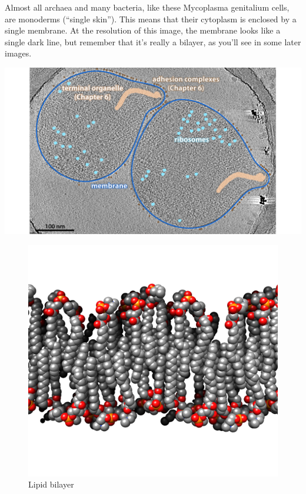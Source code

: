 \documentclass[]{tufte-book}
\begin{document}
Almost all archaea and many bacteria, like these Mycoplasma genitalium
cells, are monoderms (``single skin''). This means that their cytoplasm
is enclosed by a single membrane. At the resolution of this image, the
membrane looks like a single dark line, but remember that it's really a
bilayer, as you'll see in some later images.

\includegraphics{img/02_static/2_1_Mgenitalium}

\begin{figure}
\includegraphics{img/02_schematic/2_1_1_LipidBilayer} \caption[Lipid bilayer]{Lipid bilayer}\label{fig:2-1-1}
\end{figure}
\end{document}
